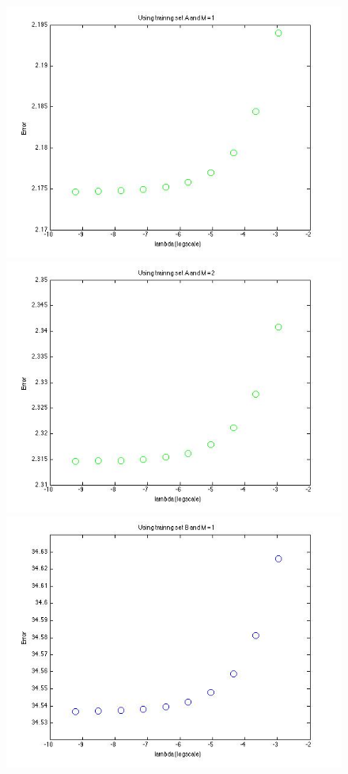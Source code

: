 \begin{figure}[!htb]
  \includegraphics[width=\linewidth]{figures/p4_LASSO_regressA_m=1}
\endminipage\hfill
{}
  \includegraphics[width=\linewidth]{figures/p4_LASSO_regressA_m=2}
\endminipage\hfill
{}                                                                                 \includegraphics[width=\linewidth]{figures/p4_LASSO_regressB_m=1}

\end{figure}
